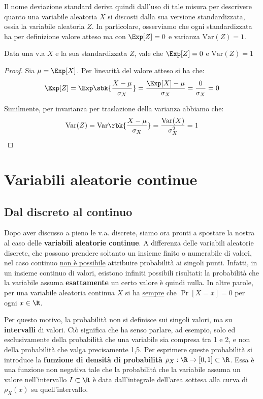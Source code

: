 \documentclass[a4paper, 12pt]{report}
\begin{document}
    Il nome deviazione standard deriva quindi dall'uso di tale misura per descrivere quanto una variabile aleatoria $X$ si discosti dalla sua versione standardizzata, ossia la variabile aleatoria $Z$. In particolare, osserviamo che ogni standardizzata ha per definizione valore atteso ma con $\Exp[Z] = 0$ e varianza $\mathrm{Var}(Z) = 1$.

    \begin{framedthm}{}
        Data una v.a $X$ e la sua standardizzata $Z$, vale che $\Exp[Z] = 0$ e $\mathrm{Var}(Z) = 1$
    \end{framedthm}

    \begin{proof}
        Sia $\mu = \Exp[X]$. Per linearità del valore atteso si ha che:
        \[\Exp[Z] = \Exp\sbk{\frac{X - \mu}{\sigma_X}} = \frac{\Exp[X]-\mu}{\sigma_X} = \frac{0}{\sigma_X} = 0 \]

        Similmente, per invarianza per traslazione della varianza abbiamo che:
        \[\mathrm{Var}(Z) = \mathrm{Var}\rbk{\frac{X - \mu}{\sigma_X}} = \frac{\mathrm{Var}(X)}{\sigma_X^2} =  1\]
    \end{proof}
    


    \chapter{Variabili aleatorie continue}

    \section{Dal discreto al continuo}

    Dopo aver discusso a pieno le v.a. discrete, siamo ora pronti a spostare la nostra al caso delle \textbf{variabili aleatorie continue}. A differenza delle variabili aleatorie discrete, che possono prendere soltanto un insieme finito o numerabile di valori, nel caso continuo \underline{non è possibile} attribuire probabilità ai singoli punti. Infatti, in un insieme continuo di valori, esistono infiniti possibili risultati: la probabilità che la variabile assuma \textbf{esattamente} un certo valore è quindi nulla. In altre parole, per una variabile aleatoria continua $X$ si ha \underline{sempre} che $\Pr[X = x] = 0$ per ogni $x \in \R$. 

    Per questo motivo, la probabilità non si definisce sui singoli valori, ma su \textbf{intervalli} di valori. Ciò significa che ha senso parlare, ad esempio, solo ed esclusivamente della probabilità che una variabile sia compresa tra 1 e 2, e non della probabilità che valga precisamente 1,5. Per esprimere queste probabilità si introduce la \textbf{funzione di densità di probabilità} $\rho_X : \R \to [0,1] \subset \R$. Essa è una funzione non negativa tale che la probabilità che la variabile assuma un valore     nell'intervallo $I \subset \R$ è data dall'integrale dell'area sottesa alla curva di $\rho_X(x)$ su quell'intervallo.
\end{document}
